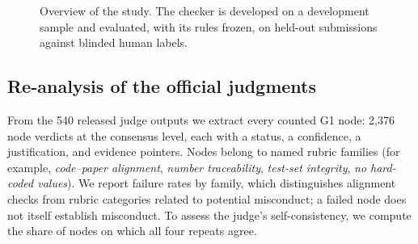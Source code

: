 \documentclass[preprint,12pt,authoryear]{elsarticle}
\begin{document}
\begin{figure}[t]
\centering
{}
\caption{Overview of the study. The checker is developed on a development sample and evaluated, with its rules frozen, on held-out submissions against blinded human labels.}
\label{fig:overview}
\end{figure}

\subsection{Re-analysis of the official judgments}\label{sec:reanalysis}

From the 540 released judge outputs we extract every counted G1 node: 2,376 node verdicts at the consensus level, each with a status, a confidence, a justification, and evidence pointers. Nodes belong to named rubric families (for example, \emph{code--paper alignment}, \emph{number traceability}, \emph{test-set integrity}, \emph{no hard-coded values}). We report failure rates by family, which distinguishes alignment checks from rubric categories related to potential misconduct; a failed node does not itself establish misconduct. To assess the judge's self-consistency, we compute the share of nodes on which all four repeats agree.
\end{document}

